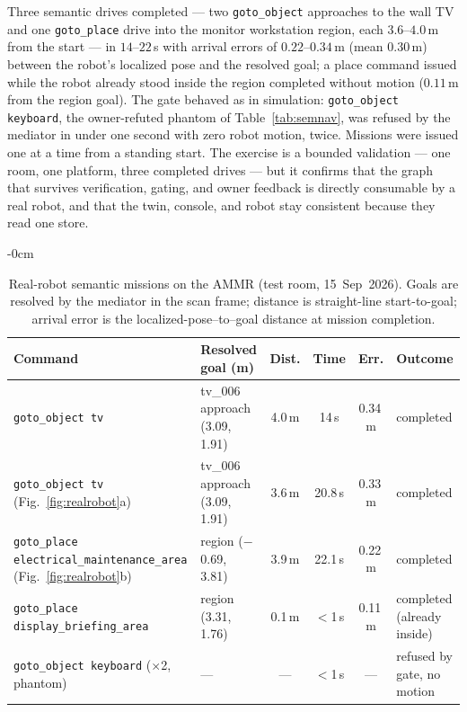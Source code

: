Three semantic drives completed --- two \texttt{goto\_object} approaches
to the wall TV and one \texttt{goto\_place} drive into the monitor
workstation region, each $3.6$--$4.0$\,m from the start --- in $14$--$22$\,s
with arrival errors of $0.22$--$0.34$\,m (mean $0.30$\,m) between the
robot's localized pose and the resolved goal; a place command issued
while the robot already stood inside the region completed without motion
($0.11$\,m from the region goal). The gate behaved as in simulation:
\texttt{goto\_object keyboard}, the owner-refuted phantom of
Table~\ref{tab:semnav}, was refused by the mediator in under one second
with zero robot motion, twice. Missions were issued one at a time from
a standing start. The exercise is a bounded validation --- one room, one
platform, three completed drives --- but it confirms that the graph that
survives verification, gating, and owner feedback is directly consumable
by a real robot, and that the twin, console, and robot stay consistent
because they read one store.

\begin{table}[t]
\caption{Real-robot semantic missions on the AMMR (test room,
15~Sep~2026). Goals are resolved by the mediator in the scan frame;
distance is straight-line start-to-goal; arrival error is the
localized-pose--to--goal distance at mission completion.}
\label{tab:realrobot}
\begin{adjustwidth}{-\extralength}{0cm}
\centering
\scriptsize
\setlength{\tabcolsep}{3.5pt}
\begin{tabular}{@{}llcccl@{}}
\toprule
\textbf{Command} & \textbf{Resolved goal (m)} & \textbf{Dist.} & \textbf{Time} & \textbf{Err.} & \textbf{Outcome} \\
\midrule
\texttt{goto\_object tv} & tv\_006 approach (3.09, 1.91) & 4.0\,m & 14\,s & 0.34\,m & completed \\
\texttt{goto\_object tv} (Fig.~\ref{fig:realrobot}a) & tv\_006 approach (3.09, 1.91) & 3.6\,m & 20.8\,s & 0.33\,m & completed \\
\texttt{goto\_place electrical\_maintenance\_area} (Fig.~\ref{fig:realrobot}b) & region ($-$0.69, 3.81) & 3.9\,m & 22.1\,s & 0.22\,m & completed \\
\texttt{goto\_place display\_briefing\_area} & region (3.31, 1.76) & 0.1\,m & $<$1\,s & 0.11\,m & completed (already inside) \\
\texttt{goto\_object keyboard} ($\times$2, phantom) & --- & --- & $<$1\,s & --- & refused by gate, no motion \\
\bottomrule
\end{tabular}
\end{adjustwidth}
\end{table}

